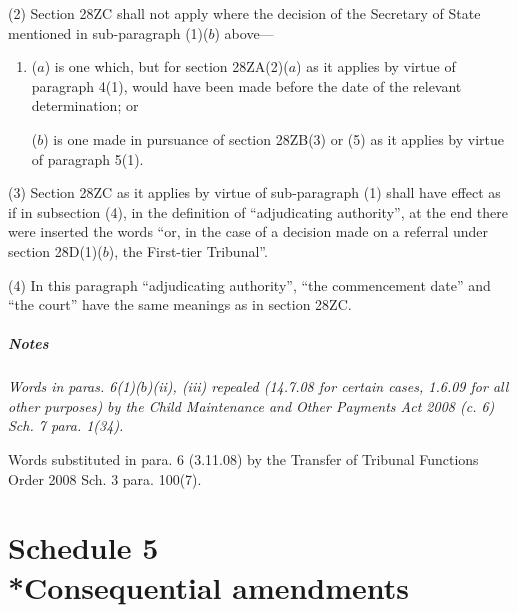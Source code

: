 \documentclass[a4paper]{article}
\newcommand{\parthead}{}
\newcommand\amendment[1]{\subsubsection*{Notes}{\itshape\frenchspacing\footnotesize #1 \par}}
\begin{document}
{(2) Section 28ZC shall not apply where the decision of the Secretary of State mentioned in sub-paragraph (1)($b$) above---
\begin{enumerate}\item[]
($a$) is one which, but for section 28ZA(2)($a$) as it applies by virtue of paragraph 4(1), would have been made before the date of the relevant determination; or

($b$) is one made in pursuance of section 28ZB(3) or (5) as it applies by virtue of paragraph 5(1).
\end{enumerate}

(3) Section 28ZC as it applies by virtue of sub-paragraph (1) shall have effect as if in subsection (4), in the definition of “adjudicating authority”, at the end there were inserted the words “or, in the case of a decision made on a referral under section 28D(1)($b$), the First-tier Tribunal”.

(4) In this paragraph “adjudicating authority”, “the commencement date” and “the court” have the same meanings as in section 28ZC.

\amendment{
Words in paras. 6(1)($b$)(ii), (iii) repealed (14.7.08 for certain cases, 1.6.09 for all other purposes) by the Child Maintenance and Other Payments Act 2008 (c. 6) Sch. 7 para. 1(34).

Words substituted in para. 6 (3.11.08) by the Transfer of Tribunal Functions Order 2008  Sch. 3 para. 100(7).
}

}

\part[Schedule 5 --- Consequential amendments]{Schedule 5\\*Consequential amendments}

\renewcommand\parthead{--- Schedule 5}


%
%
%
\end{document}
